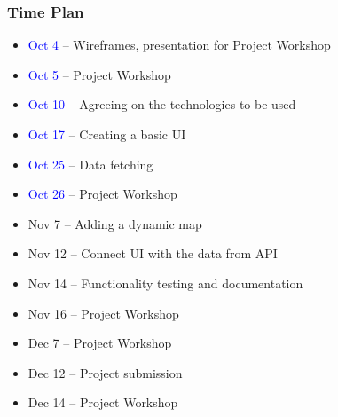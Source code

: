 \documentclass[10pt,xcolor=pdflatex,hyperref={unicode}]{beamer}
\begin{document}
\begin{frame}\frametitle{Time Plan}
    \begin{itemize}
        \item[] \textcolor{blue}{Oct 4} -- Wireframes, presentation for Project Workshop
        \item[] \textcolor{blue}{Oct 5} -- Project Workshop
        \item[] \textcolor{blue}{Oct 10} -- Agreeing on the technologies to be used
        \item[] \textcolor{blue}{Oct 17} -- Creating a basic UI
        \item[] \textcolor{blue}{Oct 25} -- Data fetching
        \item[] \textcolor{blue}{Oct 26} -- Project Workshop
        \item[] \alert{Nov 7}  -- Adding a dynamic map
        \item[] \alert{Nov 12} -- Connect UI with the data from API
        \item[] \alert{Nov 14} -- Functionality testing and documentation
        \item[] \alert{Nov 16} -- Project Workshop
        \item[] \alert{Dec 7}  -- Project Workshop
        \item[] \alert{Dec 12} -- Project submission
        \item[] \alert{Dec 14} -- Project Workshop
    \end{itemize}
\end{frame}


\end{document}
